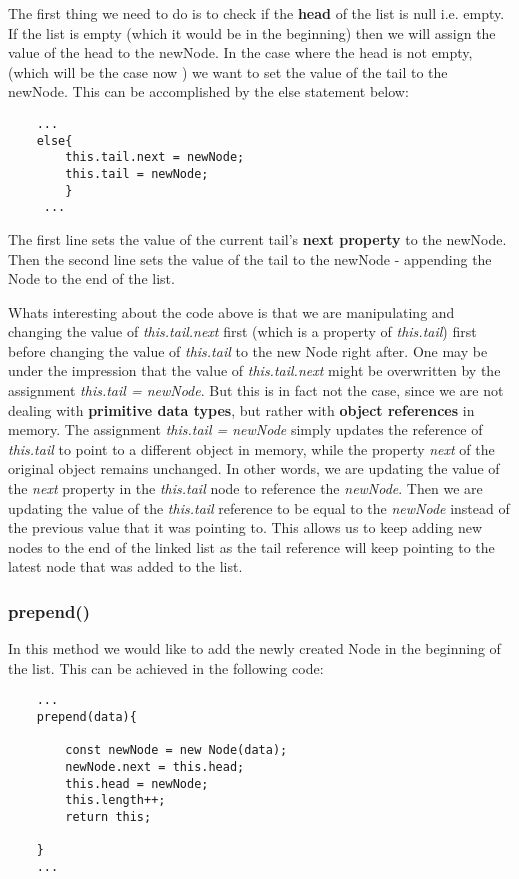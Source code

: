 \documentclass{article}
\begin{document}
The first thing we need to do is to check if the \textbf{head} of the list is null i.e. empty. If the list is empty (which it would be in the beginning) then we will assign the value of the head to the newNode.
In the case where the head is not empty, (which will be the case now ) we want to set the value of the tail to the newNode. This can be accomplished by the else statement below:

\begin{verbatim}
    ...
    else{
        this.tail.next = newNode;
        this.tail = newNode;
        }
     ...
\end{verbatim}

The first line sets the value of the current tail's \textbf{next property} to the newNode. Then the second line sets the value of the tail to the newNode - appending the Node to the end of the list.

Whats interesting about the code above is that we are manipulating and changing the value of \textit{this.tail.next} first (which is a property of \textit{this.tail}) first before changing the value of \textit{this.tail} to the new Node right after. 
One may be under the impression that the value of \textit{this.tail.next} might be overwritten by the assignment \textit{this.tail = newNode}. But this is in fact not the case, since we are not dealing with \textbf{primitive data types}, but rather with \textbf{object references} in memory. 
The assignment \textit{this.tail = newNode} simply updates the reference of \textit{this.tail} to point to a different object in memory, while the property \textit{next} of the original object remains unchanged.
In other words, we are updating the value of the \textit{next} property in the \textit{this.tail} node to reference the \textit{newNode}. Then we are updating the value of the \textit{this.tail} reference to be equal to the \textit{newNode} instead of the previous value that it was pointing to. This allows us to keep adding new nodes to the end of the linked list as the tail reference will keep pointing to the latest node that was added to the list.

\subsubsection{prepend()}

In this method we would like to add the newly created Node in the beginning of the list. This can be achieved in the following code:

\begin{verbatim}
    ...
    prepend(data){
    
        const newNode = new Node(data);
        newNode.next = this.head;
        this.head = newNode;
        this.length++;
        return this;

    }
    ...

\end{verbatim}
\end{document}
